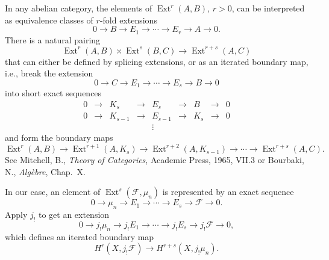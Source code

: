 \documentclass[11pt]{article}
\newcommand{\F}{\mathcal F}
\newcommand{\Ext}{\operatorname{Ext}}
\begin{document}
In any abelian category, the elements of $\Ext^r(A,B)$, $r>0$, can be interpreted as equivalence classes of $r$-fold extensions
\[
0\longrightarrow B\longrightarrow E_1\longrightarrow\cdots
\longrightarrow E_r\longrightarrow A\longrightarrow0.
\]
There is a natural pairing
\[
\Ext^r(A,B)\times\Ext^s(B,C)\longrightarrow\Ext^{r+s}(A,C)
\]
that can either be defined by splicing extensions, or as an iterated boundary map, i.e., break the extension
\[
0\longrightarrow C\longrightarrow E_1\longrightarrow\cdots
\longrightarrow E_s\longrightarrow B\longrightarrow0
\]
into short exact sequences
\[
\begin{array}{rrrrrrrrrrr}
0&\longrightarrow&K_s&\longrightarrow&E_s&\longrightarrow&B&\longrightarrow&0\\
0&\longrightarrow&K_{s-1}&\longrightarrow&E_{s-1}&\longrightarrow&K_s&\longrightarrow&0\\
&&&&\vdots
\end{array}
\]
and form the boundary maps
\[
\Ext^r(A,B)\longrightarrow\Ext^{r+1}(A,K_s)
\longrightarrow\Ext^{r+2}(A,K_{s-1})
\longrightarrow\cdots\longrightarrow\Ext^{r+s}(A,C).
\]
See Mitchell, B., \textit{Theory of Categories}, Academic Press, 1965, VII.3 or Bourbaki, N., \textit{Alg\`ebre}, Chap.\ X.

In our case, an element of $\Ext^s(\F,\mu_n)$ is represented by an exact sequence
\[
0\longrightarrow\mu_n\longrightarrow E_1\longrightarrow\cdots
\longrightarrow E_s\longrightarrow\F\longrightarrow0.
\]
Apply $j_!$ to get an extension
\[
0\longrightarrow j_!\mu_n\longrightarrow j_!E_1\longrightarrow\cdots
\longrightarrow j_!E_s\longrightarrow j_!\F\longrightarrow0,
\]
which defines an iterated boundary map
\[
H^r(X,j_!\F)\longrightarrow H^{r+s}(X,j_!\mu_n).
\]
\end{document}
